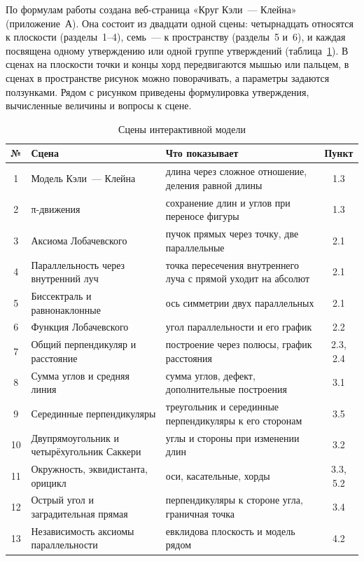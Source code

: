 По формулам работы создана веб-страница «Круг Кэли~--- Клейна» (приложение~А). Она состоит из двадцати одной сцены: четырнадцать относятся к плоскости (разделы~1--4), семь~--- к пространству (разделы~5 и~6), и каждая посвящена одному утверждению или одной группе утверждений (таблица~\ref{tab:sceny}). В сценах на плоскости точки и концы хорд передвигаются мышью или пальцем, в сценах в пространстве рисунок можно поворачивать, а параметры задаются ползунками. Рядом с рисунком приведены формулировка утверждения, вычисленные величины и вопросы к сцене.

\begin{table}[H]
\caption{Сцены интерактивной модели}
\label{tab:sceny}
\centering
\singlespacing\footnotesize
\begin{tabular}{|c|>{\raggedright\arraybackslash}p{5.4cm}|>{\raggedright\arraybackslash}p{6.6cm}|c|}
\hline
№ & Сцена & Что показывает & Пункт \\ \hline
1 & Модель Кэли~--- Клейна & длина через сложное отношение, деления равной длины & 1.3 \\ \hline
2 & π-движения & сохранение длин и углов при переносе фигуры & 1.3 \\ \hline
3 & Аксиома Лобачевского & пучок прямых через точку, две параллельные & 2.1 \\ \hline
4 & Параллельность через внутренний луч & точка пересечения внутреннего луча с прямой уходит на абсолют & 2.1 \\ \hline
5 & Биссектраль и равнонаклонные & ось симметрии двух параллельных & 2.1 \\ \hline
6 & Функция Лобачевского & угол параллельности и его график & 2.2 \\ \hline
7 & Общий перпендикуляр и расстояние & построение через полюсы, график расстояния & 2.3, 2.4 \\ \hline
8 & Сумма углов и средняя линия & сумма углов, дефект, дополнительные построения & 3.1 \\ \hline
9 & Серединные перпендикуляры & треугольник и серединные перпендикуляры к его сторонам & 3.5 \\ \hline
10 & Двупрямоугольник и четырёхугольник Саккери & углы и стороны при изменении длин & 3.2 \\ \hline
11 & Окружность, эквидистанта, орицикл & оси, касательные, хорды & 3.3, 5.2 \\ \hline
12 & Острый угол и заградительная прямая & перпендикуляры к стороне угла, граничная точка & 3.4 \\ \hline
13 & Независимость аксиомы параллельности & евклидова плоскость и модель рядом & 4.2 \\ \hline

\end{tabular}
\end{table}
